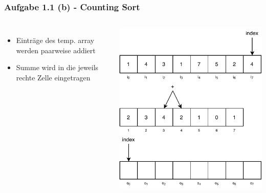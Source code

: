 \documentclass[aspectratio=169]{beamer}
\begin{document}
\begin{frame}
	\frametitle{Aufgabe 1.1 (b) - Counting Sort}
	\begin{columns}[c] %
	
	\begin{itemize}
		\item Einträge des temp. array werden paarweise addiert
		\item Summe wird in die jeweils rechte Zelle eingetragen
	\end{itemize}
	
	\includegraphics[scale=.7]{cs8.pdf}
	
	\end{columns}
	\end{frame}
\end{document}
